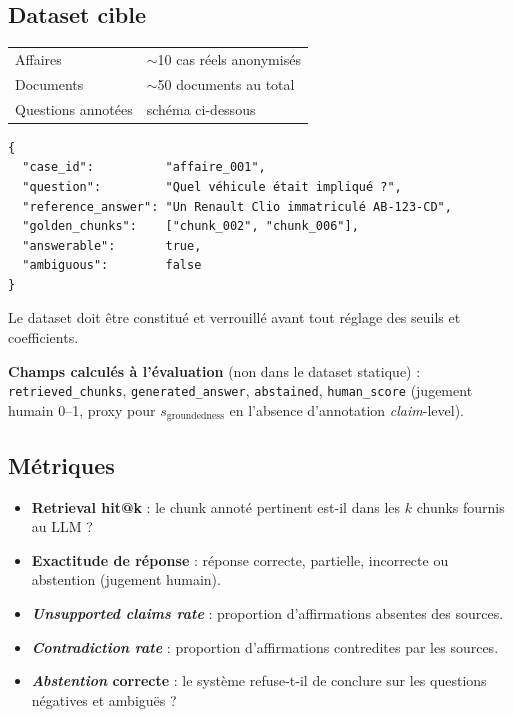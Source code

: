 \subsection*{Dataset cible}

\begin{center}
\begin{tabular}{ll}
\toprule
Affaires            & $\sim$10 cas réels anonymisés \\
Documents           & $\sim$50 documents au total \\
Questions annotées  & schéma ci-dessous \\
\bottomrule
\end{tabular}
\end{center}

\begin{verbatim}
{
  "case_id":          "affaire_001",
  "question":         "Quel véhicule était impliqué ?",
  "reference_answer": "Un Renault Clio immatriculé AB-123-CD",
  "golden_chunks":    ["chunk_002", "chunk_006"],
  "answerable":       true,
  "ambiguous":        false
}
\end{verbatim}

Le dataset doit être constitué et verrouillé avant tout réglage des seuils
et coefficients.

\noindent\textbf{Champs calculés à l'évaluation} (non dans le dataset statique) :
\texttt{retrieved\_chunks}, \texttt{generated\_answer}, \texttt{abstained},
\texttt{human\_score} (jugement humain 0--1, proxy pour $s_{\text{groundedness}}$
en l'absence d'annotation \textit{claim}-level).

\subsection*{Métriques}

\begin{itemize}
  \item \textbf{Retrieval hit@k} : le chunk annoté pertinent est-il dans
        les $k$ chunks fournis au LLM ?
  \item \textbf{Exactitude de réponse} : réponse correcte, partielle,
        incorrecte ou abstention (jugement humain).
  \item \textbf{\textit{Unsupported claims rate}} : proportion d'affirmations
        absentes des sources.
  \item \textbf{\textit{Contradiction rate}} : proportion d'affirmations
        contredites par les sources.
  \item \textbf{\textit{Abstention} correcte} : le système refuse-t-il de
        conclure sur les questions négatives et ambiguës ?
\end{itemize}

